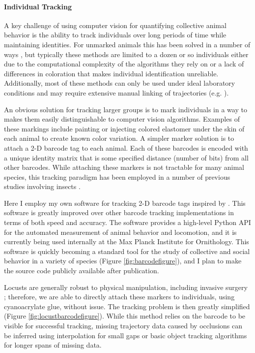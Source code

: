 \documentclass[11pt,a4paper,oneside]{article}
\begin{document}
	\paragraph{Individual Tracking}
	A key challenge of using computer vision for quantifying collective animal behavior is the ability to track individuals over long periods of time while maintaining identities. For unmarked animals this has been solved in a number of ways \citep{perez2014idtracker,rodriquez2017toxtrac,rasch2016closing}, but typically these methods are limited to a dozen or so individuals either due to the computational complexity of the algorithms they rely on or a lack of differences in coloration that makes individual identification unreliable. Additionally, most of these methods can only be used under ideal laboratory conditions and may require extensive manual linking of trajectories (e.g. \citealp{rosenthal2015network}).
	\par
	An obvious solution for tracking larger groups is to mark individuals in a way to makes them easily distinguishable to computer vision algorithms. Examples of these markings include painting or injecting colored elastomer under the skin of each animal to create known color variation. A simpler marker solution is to attach a 2-D barcode tag to each animal. Each of these barcodes is encoded with a unique identity matrix that is some specified distance (number of bits) from all other barcodes. While attaching these markers is not tractable for many animal species, this tracking paradigm has been employed in a number of previous studies involving insects \citep{crall2016social,heyman2017ants,mersch2013tracking}.
	\par
	Here I employ my own software for tracking 2-D barcode tags inspired by \citet{crall2015beetag}. This software is greatly improved over other barcode tracking implementations in terms of both speed and accuracy. The software provides a high-level Python API for the automated measurement of animal behavior and locomotion, and it is currently being used internally at the Max Planck Institute for Ornithology. This software is quickly becoming a standard tool for the study of collective and social behavior in a variety of species (Figure \ref{fig:barcodefigure}), and I plan to make the source code publicly available after publication.
	\par
	Locusts are generally robust to physical manipulation, including invasive surgery \citep{bazazi2008collective}; therefore, we are able to directly attach these markers to individuals, using cyanoacrylate glue, without issue. The tracking problem is then greatly simplified (Figure \ref{fig:locustbarcodefigure}). While this method relies on the barcode to be visible for successful tracking, missing trajectory data caused by occlusions can be inferred using interpolation for small gaps or basic object tracking algorithms for longer spans of missing data. 
	
\end{document}
